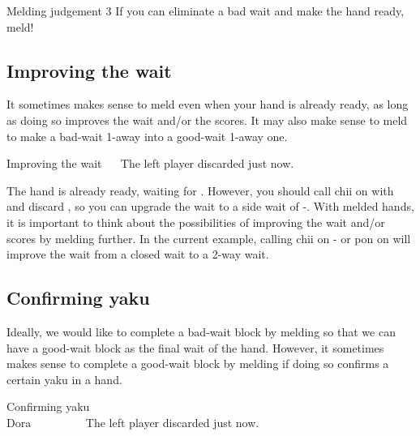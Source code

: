 \bigskip
\color{MyRed}
\begin{itembox}[c]{Melding judgement 3}\normalcolor
If you can eliminate a bad wait and make the hand ready, meld!
\end{itembox}\normalcolor

\bigskip
\subsection{Improving the wait}
It sometimes makes sense to meld even when your hand is already ready, as long as doing so improves the wait and/or the scores. It may also make sense to meld to make a bad-wait 1-away into a good-wait 1-away one. 

\bigskip
\begin{itembox}[r]{Improving the wait}
\bp
{}\rfw{}\rfd{}~~\zhong\zhong\rzhong
\ep
\vspace{-5pt}The left player discarded {\LARGE{}} just now.
\end{itembox}

\bigskip
The hand is already ready, waiting for {\LARGE{}}. However, you should call {\jap chii} on {\LARGE{}} with {\LARGE{}} and discard {\LARGE{}}, so you can upgrade the wait to a side wait of {\LARGE{}-}. 
With melded hands, it is important to think about the possibilities of improving the wait and/or scores by melding further. 
In the current example, calling {\jap chii} on {\LARGE{}-} or {\jap pon} on {\LARGE{}} will improve the wait from a closed wait to a 2-way wait. 

\newpage
\subsection{Confirming {\jap yaku}}
Ideally, we would like to complete a bad-wait block by melding so that we can have a good-wait block as the final wait of the hand. However, it sometimes makes sense to complete a good-wait block by melding if doing so confirms a certain {\jap yaku} in a hand. 

\bigskip
\begin{itembox}[r]{Confirming {\jap yaku}}
\bp
{}\rfs{}~~\\
\hfill\footnotesize{{\jap Dora}~~~~~~~~~}
\ep
\vspace{-15pt}The left player discarded {\LARGE{}} just now.
\end{itembox}

